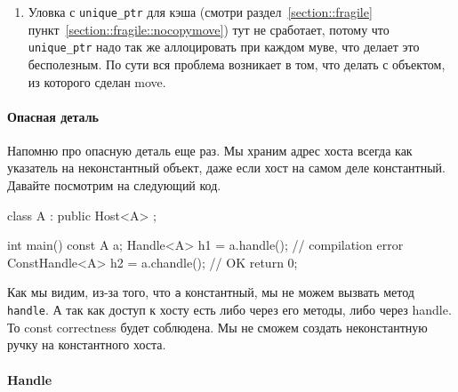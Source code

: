 \begin{enumerate}
\item Уловка с \verb"unique_ptr" для кэша (смотри раздел~\ref{section::fragile} пункт~\ref{section::fragile::nocopymove}) тут не сработает, потому что \verb"unique_ptr" надо так же аллоцировать при каждом муве, что делает это бесполезным.
По сути вся проблема возникает в том, что делать с объектом, из которого сделан move.
\end{enumerate}

\paragraph{Опасная деталь}

Напомню про опасную деталь еще раз.
Мы храним адрес хоста всегда как указатель на неконстантный объект, даже если хост на самом деле константный.
Давайте посмотрим на следующий код.
\begin{cppcode}
class A : public Host<A> {};

int main() {
  const A a;
  Handle<A> h1 = a.handle(); // compilation error
  ConstHandle<A> h2 = a.chandle(); // OK
  return 0;
}
\end{cppcode}
Как мы видим, из-за того, что \verb"a" константный, мы не можем вызвать метод \verb"handle".
А так как доступ к хосту есть либо через его методы, либо через handle.
То const correctness будет соблюдена.
Мы не сможем создать неконстантную ручку на константного хоста.

\paragraph{Handle}

